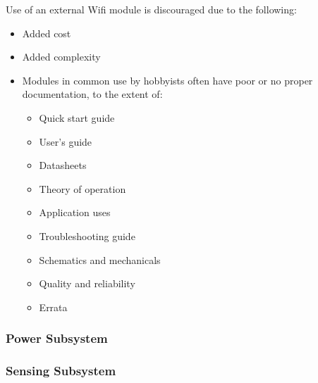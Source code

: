 \begin{flushleft}
    Use of an external Wifi module is discouraged due to the following:
    \begin{itemize}
        \item Added cost
        \item Added complexity
        \item Modules in common use by hobbyists often have poor or no proper documentation, to the
        extent of:
        \begin{itemize}
            \item Quick start guide
            \item User's guide
            \item Datasheets
            \item Theory of operation
            \item Application uses
            \item Troubleshooting guide
            \item Schematics and mechanicals
            \item Quality and reliability
            \item Errata
        \end{itemize}
    \end{itemize}
\end{flushleft}

\subsubsection{Power Subsystem}
\subsubsection{Sensing Subsystem}